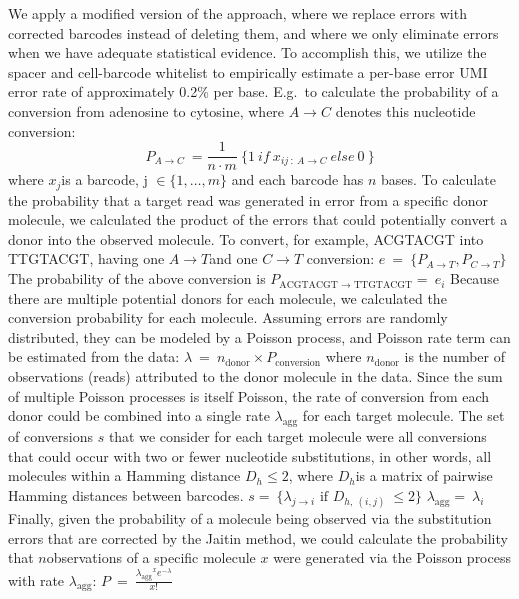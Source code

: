 We apply a modified version of the \citep{Jaitin2014} approach, where we replace errors with corrected barcodes instead of deleting them, and where we only eliminate errors when we have adequate statistical evidence. 
To accomplish this, we utilize the spacer and cell-barcode whitelist to empirically estimate a per-base error UMI error rate of approximately 0.2\% per base. 
E.g.\ to calculate the probability of a conversion from adenosine to cytosine, where \(A \rightarrow C\) denotes this nucleotide conversion:
\[P_{A \rightarrow C}\  = \frac{1}{n \cdot m}\ \{ 1\ if\ x_{ij\ :\ A \rightarrow C}\ else\ 0\ \}\]
where \(x_{j}\)is a barcode, \(\text{j\ } \in \{ 1,\ldots,m\}\) and each barcode has \(n\) bases.
To calculate the probability that a target read was generated in error from a specific donor molecule, we calculated the product of the errors that could potentially convert a donor into the observed molecule. 
To convert, for example, ACGTACGT into TTGTACGT, having one \(A \rightarrow T\)and one \(C \rightarrow T\) conversion:
\(e\  = \ \{ P_{A \rightarrow T},P_{C \rightarrow T}\}\ \)
The probability of the above conversion is
\(P_{\text{ACGTACGT\ } \rightarrow \text{\ TTGTACGT}} = \ e_{i}\)
Because there are multiple potential donors for each molecule, we calculated the conversion probability for each molecule. 
Assuming errors are randomly distributed, they can be modeled by a Poisson process, and Poisson rate term can be estimated from the data:
\(\lambda\  = \ n_{\text{donor}} \times P_{\text{conversion}}\)
where \(n_{\text{donor}}\) is the number of observations (reads) attributed to the donor molecule in the data. 
Since the sum of multiple Poisson processes is itself Poisson, the rate of conversion from each donor could be combined into a single rate \(\lambda_{\text{agg}}\) for each target molecule. 
The set of conversions \(s\) that we consider for each target molecule were all conversions that could occur with two or fewer nucleotide substitutions, in other words, all molecules within a Hamming distance \(D_{h} \leq 2\), where \(D_{h}\)is a matrix of pairwise Hamming distances between barcodes.
\(s = \ \{\lambda_{j \rightarrow i}\text{\ if\ }D_{h,\ (i,j)}\  \leq 2\}\)
\(\lambda_{\text{agg}} = \ \lambda_{i}\)
Finally, given the probability of a molecule being observed via the substitution errors that are corrected by the Jaitin method, we could calculate the probability that \(n\)observations of a specific molecule \(x\) were generated via the Poisson process with rate \(\lambda_{\text{agg}}\):
\(P\  = \ \frac{{\lambda_{\text{agg}}}^{x}e^{- \lambda}}{x!}\)

